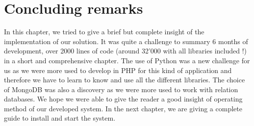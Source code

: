 \section{Concluding remarks}
In this chapter, we tried to give a brief but complete insight of the implementation of our solution. It was quite a challenge to summary 6 months of development, over 2000 lines of code (around 32'000 with all libraries included !) in a short and comprehensive chapter. The use of Python was a new challenge for us as we were more used to develop in PHP for this kind of application and therefore we have to learn to know and use all the different libraries. The choice of MongoDB was also a discovery as we were more used to work with relation databases. We hope we were able to give the reader a good insight of operating method of our developed system. In the next chapter, we are giving a complete guide to install and start the system.
